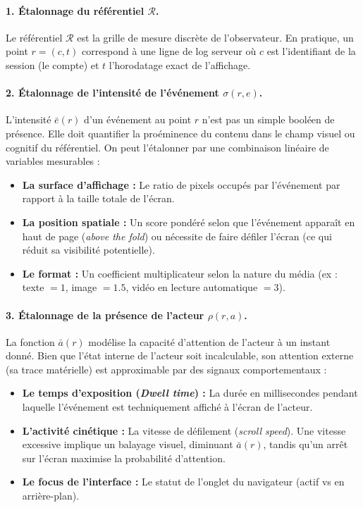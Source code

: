 \documentclass[11pt]{article}
\begin{document}
			\paragraph{1. Étalonnage du référentiel $\mathcal{R}$.}
			Le référentiel $\mathcal{R}$ est la grille de mesure discrète de l'observateur. En pratique, un point $r = (c,t)$ correspond à une ligne de log serveur où $c$ est l'identifiant de la session (le compte) et $t$ l'horodatage exact de l'affichage. 
			
			\paragraph{2. Étalonnage de l'intensité de l'événement $\sigma(r,e)$.}
			L'intensité $\bar{e}(r)$ d'un événement au point $r$ n'est pas un simple booléen de présence. Elle doit quantifier la proéminence du contenu dans le champ visuel ou cognitif du référentiel. On peut l'étalonner par une combinaison linéaire de variables mesurables :
			\begin{itemize}
				\item \textbf{La surface d'affichage :} Le ratio de pixels occupés par l'événement par rapport à la taille totale de l'écran.
				\item \textbf{La position spatiale :} Un score pondéré selon que l'événement apparaît en haut de page (\textit{above the fold}) ou nécessite de faire défiler l'écran (ce qui réduit sa visibilité potentielle).
				\item \textbf{Le format :} Un coefficient multiplicateur selon la nature du média (ex : texte $= 1$, image $= 1.5$, vidéo en lecture automatique $= 3$).
			\end{itemize}
			
			\paragraph{3. Étalonnage de la présence de l'acteur $\rho(r,a)$.}
			La fonction $\bar{a}(r)$ modélise la capacité d'attention de l'acteur à un instant donné. Bien que l'état interne de l'acteur soit incalculable, son attention externe (sa trace matérielle) est approximable par des signaux comportementaux :
			\begin{itemize}
				\item \textbf{Le temps d'exposition (\textit{Dwell time}) :} La durée en millisecondes pendant laquelle l'événement est techniquement affiché à l'écran de l'acteur.
				\item \textbf{L'activité cinétique :} La vitesse de défilement (\textit{scroll speed}). Une vitesse excessive implique un balayage visuel, diminuant $\bar{a}(r)$, tandis qu'un arrêt sur l'écran maximise la probabilité d'attention.
				\item \textbf{Le focus de l'interface :} Le statut de l'onglet du navigateur (actif vs en arrière-plan).
			\end{itemize}
			
\end{document}
